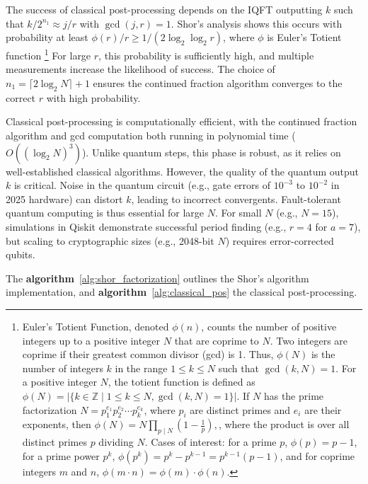 \documentclass[conference,twoside]{IEEEtran}
\begin{document}
The success of classical post-processing depends on the IQFT outputting \( k \) such that \( k / 2^{n_1} \approx j / r \) with \( \gcd(j, r) = 1 \). Shor's analysis shows this occurs with probability at least \( \phi(r) / r \geq 1 / (2 \log_2 \log_2 r) \), where \( \phi \) is Euler’s Totient function \footnote{Euler's Totient Function, denoted \(\phi(n)\), counts the number of positive integers up to a positive integer \(N\) that are coprime to \(N\). Two integers are coprime if their greatest common divisor (gcd) is 1. Thus, \(\phi(N)\) is the number of integers \(k\) in the range \(1 \leq k \leq N\) such that \(\gcd(k, N) = 1\). For a positive integer \(N\), the totient function is defined as \(\phi(N) = |\{ k \in \mathbb{Z} \mid 1 \leq k \leq N, \gcd(k, N) = 1 \}|
\). If \(N\) has the prime factorization \(N = p_1^{e_1} p_2^{e_2} \cdots p_k^{e_k}\), where \(p_i\) are distinct primes and \(e_i\) are their exponents, then \(
\phi(N) = N \prod_{p \mid N} \left(1 - \frac{1}{p}\right),
\), where the product is over all distinct primes \(p\) dividing \(N\). Cases of interest: for a prime \(p\), \(\phi(p) = p - 1 \), for a prime power \(p^k\), \(\phi(p^k) = p^k - p^{k-1} = p^{k-1}(p - 1) \), and for coprime integers \(m\) and \(n\), \( \phi(m \cdot n) = \phi(m) \cdot \phi(n) \).}  For large \( r \), this probability is sufficiently high, and multiple measurements increase the likelihood of success. The choice of \( n_1 = \lceil 2 \log_2 N \rceil+ 1 \) ensures the continued fraction algorithm converges to the correct \( r \) with high probability.

Classical post-processing is computationally efficient, with the continued fraction algorithm and gcd computation both running in polynomial time (\( O((\log_2 N)^3) \)). Unlike quantum steps, this phase is robust, as it relies on well-established classical algorithms. However, the quality of the quantum output \( k \) is critical. Noise in the quantum circuit (e.g., gate errors of \( 10^{-3} \) to \( 10^{-2} \) in 2025 hardware) can distort \( k \), leading to incorrect convergents. Fault-tolerant quantum computing is thus essential for large \( N \). For small \( N \) (e.g., \( N = 15 \)), simulations in Qiskit demonstrate successful period finding (e.g., \( r = 4 \) for \( a = 7 \)), but scaling to cryptographic sizes (e.g., 2048-bit \( N \)) requires error-corrected qubits.

The \textbf{algorithm}~\ref{alg:shor_factorization} outlines the Shor's algorithm implementation, and \textbf{algorithm}~\ref{alg:classical_pos} the classical post-processing.
\end{document}
